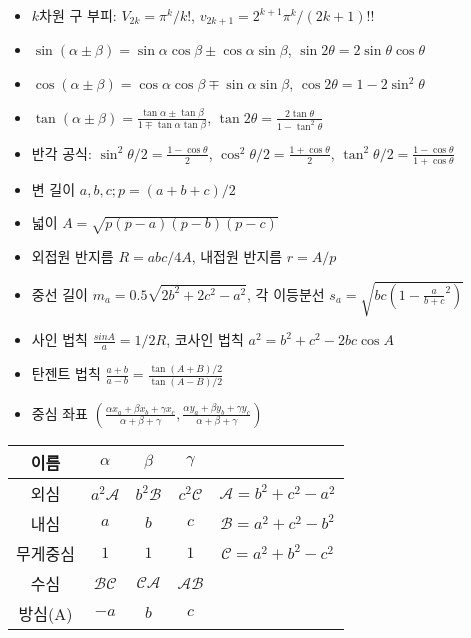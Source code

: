\begin{itemize}[noitemsep]
    \item $k$차원 구 부피: $V_{2k}=\pi^k/k!$, $v_{2k+1}=2^{k+1}\pi^k/(2k+1)!!$
    \item $\sin(\alpha \pm \beta) = \sin \alpha \cos \beta \pm \cos \alpha \sin \beta$, $\sin 2\theta = 2 \sin \theta \cos \theta$
    \item $\cos(\alpha \pm \beta) = \cos \alpha \cos \beta \mp \sin \alpha \sin \beta$, $\cos 2\theta = 1 - 2\sin^2 \theta$
    \item $\tan(\alpha \pm \beta) = \frac{\tan \alpha \pm \tan \beta}{1 \mp \tan \alpha \tan \beta}$, $\tan 2\theta = \frac{2\tan \theta}{1-\tan^2 \theta}$
    \item 반각 공식: $\sin^2 \theta/2 = \frac{1-\cos \theta}{2}$, $\cos^2 \theta/2 = \frac{1+\cos \theta}{2}$, $\tan^2 \theta/2 = \frac{1-\cos \theta}{1+\cos \theta}$
    \item 변 길이 $a, b, c; p = (a+b+c)/2$
    \item 넓이 $A = \sqrt{p(p-a)(p-b)(p-c)}$
    \item 외접원 반지름 $R = abc/4A$, 내접원 반지름 $r = A/p$
    \item 중선 길이 $m_a = 0.5\sqrt{2b^2 + 2c^2 - a^2}$, 각 이등분선 $s_a = \sqrt{bc(1-\frac{a}{b+c}^2)}$
    \item 사인 법칙 $\frac{sin A}{a} = 1/2R$, 코사인 법칙 $a^2 = b^2 + c^2 - 2bc\cos A$
    \item 탄젠트 법칙 $\frac{a+b}{a-b} = \frac{\tan (A+B)/2}{\tan (A-B)/2}$
    \item 중심 좌표 $(\frac{\alpha x_a + \beta x_b + \gamma x_c}{\alpha+\beta+\gamma}, \frac{\alpha y_a + \beta y_b + \gamma y_c}{\alpha+\beta+\gamma})$
\end{itemize}

\begin{tabular}{|c|c|c|c|c|}
    이름 & $\alpha$ & $\beta$ & $\gamma$ & \\ \hline
    외심 & $a^2\mathcal{A}$ & $b^2\mathcal{B}$ & $c^2\mathcal{C}$ & $\mathcal{A}=b^2+c^2-a^2$ \\
    내심 & $a$ & $b$ & $c$ & $\mathcal{B} = a^2 + c^2 - b^2$ \\
    무게중심 & $1$ & $1$ & $1$ & $\mathcal{C} = a^2 + b^2 - c^2$ \\
    수심 & $\mathcal{BC}$ & $\mathcal{CA}$ & $\mathcal{AB}$ & \\
    방심(A) & $-a$ & $b$ & $c$ & 
\end{tabular}